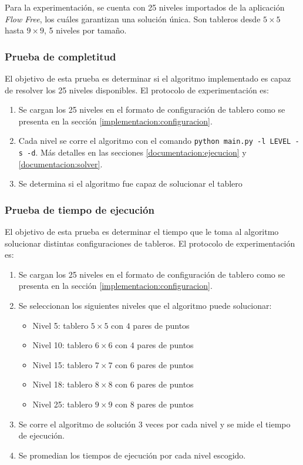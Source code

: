 \documentclass[letter,12pt]{article}
\begin{document}
Para la experimentación, se cuenta con 25 niveles importados de la aplicación \textit{Flow Free}, los cuáles garantizan una solución única. Son tableros desde $5 \times 5$ hasta $9 \times 9$, 5 niveles por tamaño.

\subsubsection{Prueba de completitud} \label{analisis:experimentacion:completitud}

El objetivo de esta prueba es determinar si el algoritmo implementado es capaz de resolver los 25 niveles disponibles. El protocolo de experimentación es:

\begin{enumerate}
    \item Se cargan los 25 niveles en el formato de configuración de tablero como se presenta en la sección \ref{implementacion:configuracion}.
    \item Cada nivel se corre el algoritmo con el comando \verb|python main.py -l LEVEL -s -d|. Más detalles en las secciones \ref{documentacion:ejecucion} y \ref{documentacion:solver}.
    \item Se determina si el algoritmo fue capaz de solucionar el tablero
\end{enumerate}

\subsubsection{Prueba de tiempo de ejecución} \label{analisis:experimentacion:tiempo}

El objetivo de esta prueba es determinar el tiempo que le toma al algoritmo solucionar distintas configuraciones de tableros. El protocolo de experimentación es:

\begin{enumerate}
    \item Se cargan los 25 niveles en el formato de configuración de tablero como se presenta en la sección \ref{implementacion:configuracion}.
    \item Se seleccionan los siguientes niveles que el algoritmo puede solucionar:
    \begin{itemize}
        \item Nivel 5: tablero $5 \times 5$ con $4$ pares de puntos
        \item Nivel 10: tablero $6 \times 6$ con $4$ pares de puntos
        \item Nivel 15: tablero $7 \times 7$ con $6$ pares de puntos
        \item Nivel 18: tablero $8 \times 8$ con $6$ pares de puntos
        \item Nivel 25: tablero $9 \times 9$ con $8$ pares de puntos
    \end{itemize}
    \item Se corre el algoritmo de solución 3 veces por cada nivel y se mide el tiempo de ejecución.
    \item Se promedian los tiempos de ejecución por cada nivel escogido.
\end{enumerate}
\end{document}
